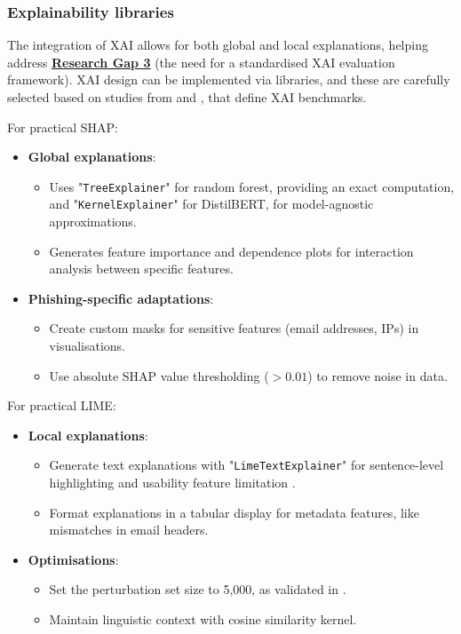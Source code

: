 
\subsubsection*{Explainability libraries}
The integration of XAI allows for both global and local explanations, helping address \hyperref[research-gap-3]{\uline{\textbf{Research Gap 3}}} (the need for a standardised XAI evaluation framework). XAI design can be implemented via libraries, and these are carefully selected based on studies from \cite{shendkar2024enhancing} and \cite{reddy2023explainable}, that define XAI benchmarks.\newline

\noindent For practical SHAP:

\begin{itemize}
  \item \textbf{Global explanations}:
  \begin{itemize}
    \item Uses "\texttt{TreeExplainer}" for random forest, providing an exact computation, and "\texttt{KernelExplainer}" for DistilBERT, for model-agnostic approximations.
    \item Generates feature importance and dependence plots for interaction analysis between specific features.
  \end{itemize}
  \item \textbf{Phishing-specific adaptations}:
  \begin{itemize}
    \item Create custom masks for sensitive features (email addresses, IPs) in visualisations.
    \item Use absolute SHAP value thresholding ($>0.01$) to remove noise in data.
  \end{itemize}
\end{itemize}

\noindent For practical LIME:

\begin{itemize}
  \item \textbf{Local explanations}:
  \begin{itemize}
    \item Generate text explanations with "\texttt{LimeTextExplainer}" for sentence-level highlighting and usability feature limitation \citep{greco2023explaining}.
    \item Format explanations in a tabular display for metadata features, like mismatches in email headers.
  \end{itemize}
  \item \textbf{Optimisations}:
  \begin{itemize}
    \item Set the perturbation set size to 5,000, as validated in \cite{ribeiro2016model}.
    \item Maintain linguistic context with cosine similarity kernel.
  \end{itemize}
\end{itemize}

